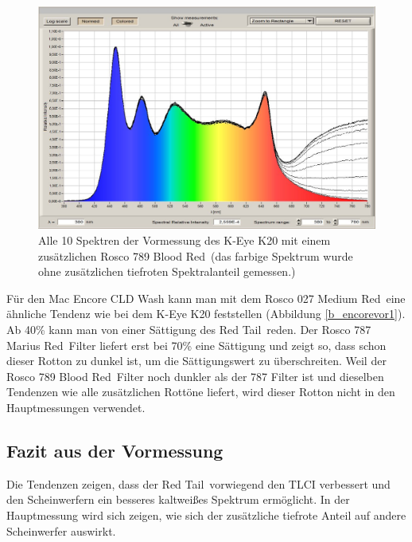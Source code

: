 \begin{figure}[H]     %
\centering
\includegraphics[width=1.0\textwidth]{bilder/keyevor3} 
\caption {Alle 10 Spektren der Vormessung des K-Eye K20 mit einem zusätzlichen Rosco 789 \glqq Blood Red\grqq\ (das farbige Spektrum wurde ohne zusätzlichen tiefroten Spektralanteil gemessen.)}\label{b_keyevor3}
\end{figure}

\noindent Für den Mac Encore CLD Wash kann man mit dem Rosco 027 \glqq Medium Red\grqq\ eine ähnliche Tendenz wie bei dem K-Eye K20 feststellen (Abbildung \ref{b_encorevor1}). Ab 40\% kann man von einer Sättigung des \glqq Red Tail\grqq\ reden. Der Rosco 787 \glqq Marius Red\grqq\ Filter liefert erst bei 70\% eine Sättigung und zeigt so, dass schon dieser Rotton zu dunkel ist, um die Sättigungswert zu überschreiten. Weil der Rosco 789 \glqq Blood Red\grqq\ Filter noch dunkler als der 787 Filter ist und dieselben Tendenzen wie alle zusätzlichen Rottöne liefert, wird dieser Rotton nicht in den Hauptmessungen verwendet. 

\newpage
\subsection{Fazit aus der Vormessung}
\label{sec_vmfazit}
Die Tendenzen zeigen, dass der \glqq Red Tail\grqq\ vorwiegend den TLCI verbessert und den Scheinwerfern ein besseres kaltweißes Spektrum ermöglicht. In der Hauptmessung wird sich zeigen, wie sich der zusätzliche tiefrote Anteil auf andere Scheinwerfer auswirkt.


